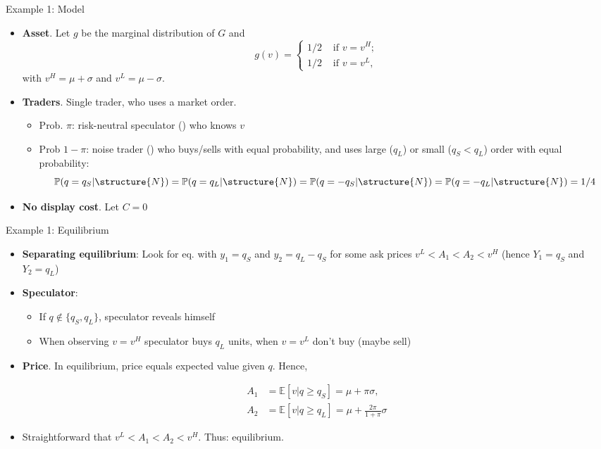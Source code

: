 \documentclass[english,10pt]{beamer}
\begin{document}
\begin{frame}{Example 1: Model} 
	\begin{itemize}
		\item \textbf{Asset}. Let $g$ be the marginal distribution of $G$ and
		\[
		g(v)=\left\{ \begin{aligned}
		1/2  & \text{ if } v=v^H; \\
		1/2 & \text{ if } v=v^L,
		\end{aligned}
		\right.
		\]
		with $v^{H}=\mu + \sigma $ and $v^{L}= \mu - \sigma $.
		\item \textbf{Traders}. Single trader, who uses a market order.
		\begin{itemize}
			\item Prob. $\pi$: risk-neutral speculator () who knows $v$
			\item Prob $1-\pi$: noise trader ()  who buys/sells with equal probability, and uses large ($q_L$) or small ($q_S<q_L$) order with equal probability:
			$$
			\mathbb{P}(q=q_S|\structure{N})= \mathbb{P}(q=q_L|\structure{N})=\mathbb{P}(q=-q_S|\structure{N})=\mathbb{P}(q=-q_L|\structure{N})=1/4
			$$
		\end{itemize}
		\item \textbf{No display cost}. Let $C=0$
	\end{itemize}
\end{frame}


\begin{frame}{Example 1: Equilibrium}
	\begin{itemize}
		\item \textbf{Separating equilibrium}: Look for eq. with $y_{1}=q_{S}$ and $y_{2}=q_{L}-q_{S}$ for some ask prices $v^L<A_1<A_2<v^H$ (hence $Y_1=q_S$ and $Y_2=q_L$)
		\item \textbf{Speculator}: 
		\begin{itemize}
			\item If $q \notin \{q_S,q_L\}$, speculator reveals himself
			\item 
			When observing $v=v^{H}$ speculator buys $q_{L}$ units, when $v=v^L$ don't buy (maybe sell)
		\end{itemize}
		\item \textbf{Price}. In equilibrium, price equals expected value given $q$. Hence,
		\begin{block}{}
			\[\begin{aligned}
			A_1 & =\mathbb{E}[v|q \geq q_{S}] = \mu + \pi \sigma,\\
			A_2 & = \mathbb{E}[v|q \geq q_{L}] = \mu + \frac{2\pi}{1+\pi} \sigma
			\end{aligned}
			\]
		\end{block}
		\item Straightforward that $v^L<A_1<A_2<v^H$. Thus: equilibrium.
	\end{itemize}
\end{frame}
\end{document}
